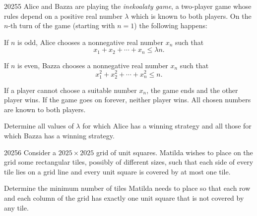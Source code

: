 \begin{problem}{2025}{5}
Alice and Bazza are playing the \emph{inekoalaty game}, a two-player game whose rules depend on a positive real number $\lambda$ which is known to both players. On the $n$-th turn of the game (starting with $n=1$) the following happens:
\begin{problemitems}
    \item If $n$ is odd, Alice chooses a nonnegative real number $x_n$ such that
    \[
        x_1+x_2+\cdots+x_n\leq\lambda n.
    \]
    \item If $n$ is even, Bazza chooses a nonnegative real number $x_n$ such that
    \[
        x_1^2+x_2^2+\cdots+x_n^2\leq n.
    \]
\end{problemitems}
If a player cannot choose a suitable number $x_n$, the game ends and the other player wins. If the game goes on forever, neither player wins. All chosen numbers are known to both players.

Determine all values of $\lambda$ for which Alice has a winning strategy and all those for which Bazza has a winning strategy.
\end{problem}

\begin{problem}{2025}{6}
Consider a $2025\times2025$ grid of unit squares. Matilda wishes to place on the grid some rectangular tiles, possibly of different sizes, such that each side of every tile lies on a grid line and every unit square is covered by at most one tile.

Determine the minimum number of tiles Matilda needs to place so that each row and each column of the grid has exactly one unit square that is not covered by any tile.
\end{problem}
